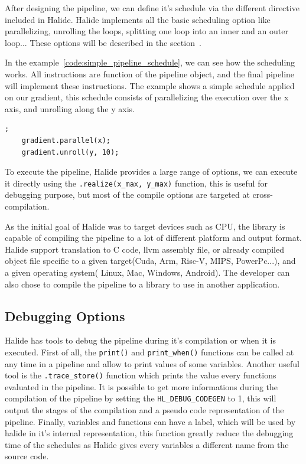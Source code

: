	After designing the  pipeline, we can define it's schedule via the different directive included in Halide. Halide implements all the basic scheduling option like parallelizing, unrolling the loops, splitting one loop into an inner and an outer loop... These options will be described in the section~. 

	In the example~\ref{code:simple_pipeline_schedule}, we can see how the scheduling works. All instructions are function of the pipeline object, and the final pipeline will implement these instructions. The example shows a simple schedule applied on our gradient, this schedule consists of parallelizing the execution over the x axis, and unrolling along the y axis.

	\begin{lstlisting}[caption={Simple Pipeline Example}, captionpos=b,label={code:simple_pipeline_schedule}];
	gradient.parallel(x);
	gradient.unroll(y, 10);
	\end{lstlisting}


	To execute the pipeline, Halide provides a large range of options, we can execute it directly using the \verb|.realize(x_max, y_max)| function, this is useful for debugging purpose, but most of the compile options are targeted at cross-compilation.
	
	As the initial goal of Halide was to target devices such as CPU, the library is capable of compiling the pipeline to a lot of different platform and output format. Halide support translation to C code, llvm assembly file, or already compiled object file specific to a given target(Cuda, Arm, Risc-V, MIPS, PowerPc...), and a given operating system( Linux, Mac, Windows, Android). The developer can also chose to compile the pipeline to a library to use in another application.

\subsection{Debugging Options}
	Halide has tools to debug the pipeline during it's compilation or when it is executed. First of all, the \verb|print()| and \verb|print_when()| functions can be called at any time in a pipeline and allow to print values of some variables. Another useful tool is the \verb|.trace_store()| function which prints the value every  functions evaluated in the pipeline. It is possible to get more informations during the compilation of the pipeline by setting the \verb|HL_DEBUG_CODEGEN| to 1, this will output the stages of the compilation and a pseudo code representation of the pipeline.
	Finally, variables and functions can have a label, which will be used by halide in it's internal representation, this function greatly reduce the debugging time of the schedules as Halide gives every variables a different name from the source code.


